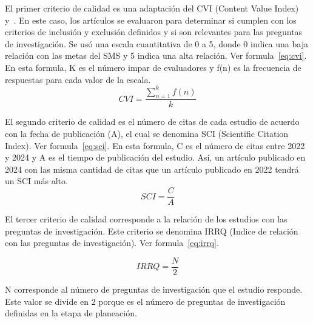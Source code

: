 El primer criterio de calidad es una adaptación del CVI (Content Value Index)~\cite{almanasreh2019evaluation} y~\cite{yaghmaei2003content}.
En este caso, los artículos se evaluaron para determinar si cumplen con los criterios de inclusión y exclusión definidos y si son relevantes para las preguntas de investigación. Se usó una escala cuantitativa de 0 a 5, donde 0 indica una baja relación con las metas del SMS y 5 indica una alta relación.
Ver formula~\ref{eq:cvi}. En esta formula, K es el número impar de evaluadores y f(n) es la frecuencia de respuestas para cada valor de la escala.\\

\begin{equation}
\label{eq:cvi}
CVI = \frac{\sum_{n=1}^{k} f(n)}{k}
\end{equation}

El segundo criterio de calidad es el número de citas de cada estudio de acuerdo con la fecha de publicación (A), el cual se denomina SCI (Scientific Citation Index). Ver formula~\ref{eq:sci}. En esta formula, C es el número de citas entre 2022 y 2024 y A es el tiempo de publicación del estudio. Así, un artículo publicado en 2024 con las misma cantidad de citas que un artículo publicado en 2022 tendrá un SCI más alto.\\

\begin{equation}
\label{eq:sci}
SCI = \frac{C}{A}
\end{equation}

El tercer criterio de calidad corresponde a la relación de los estudios con las preguntas de investigación. Este criterio se denomina IRRQ (Indice de relación con las preguntas de investigación). Ver formula~\ref{eq:irrq}. 

\begin{equation}
\label{eq:irrq}
IRRQ = \frac{N}{2}
\end{equation}

N corresponde al número de preguntas de investigación que el estudio responde. Este valor se divide en 2 porque es el número de preguntas de investigación definidas en la etapa de planeación. \\